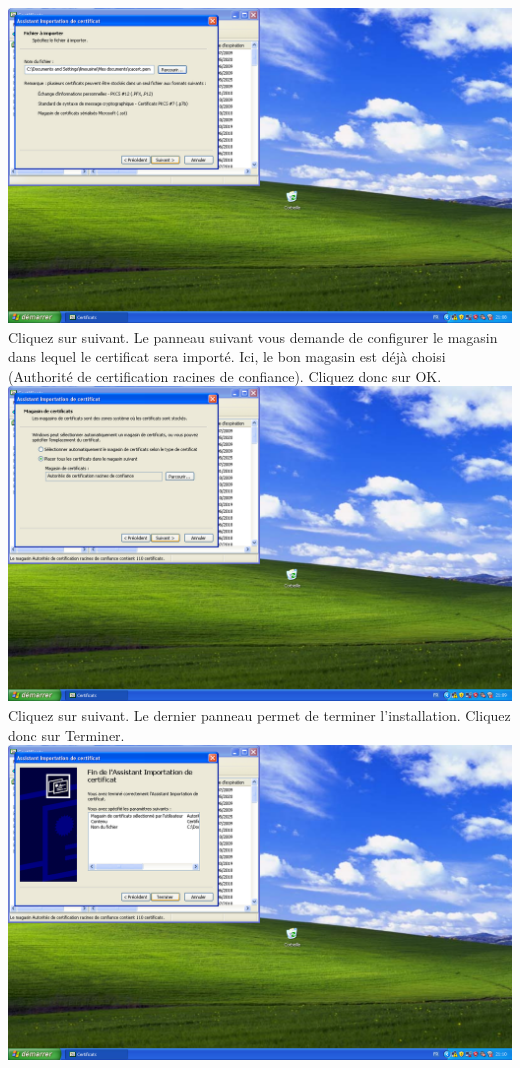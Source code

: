 \includegraphics[width=\screenShotSize{}]{img/importCacertFile.PNG}\\
Cliquez sur suivant. Le panneau suivant vous demande de configurer le magasin dans lequel le certificat sera importé. Ici, le bon magasin est déjà choisi (Authorité de certification racines de confiance). Cliquez donc sur OK.\\
\includegraphics[width=\screenShotSize{}]{img/importCacertStorage.PNG}\\
Cliquez sur suivant. Le dernier panneau permet de terminer l'installation. Cliquez donc sur Terminer.\\
\includegraphics[width=\screenShotSize{}]{img/importCacertFinish.PNG}\\
